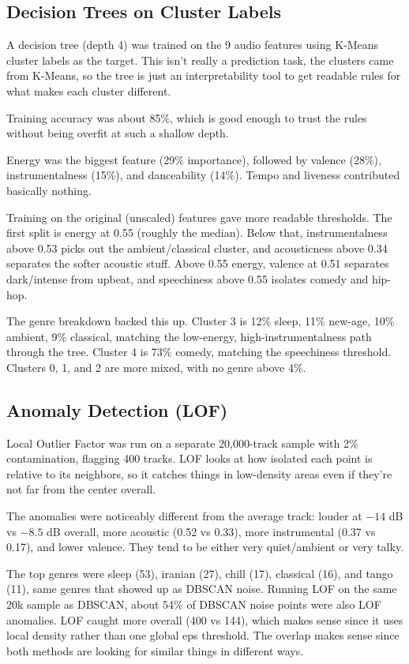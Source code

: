 \documentclass[10pt,twocolumn]{article}
\begin{document}
\subsection{Decision Trees on Cluster Labels}

A decision tree (depth 4) was trained on the 9 audio features using K-Means cluster labels as the target. This isn't really a prediction task, the clusters came from K-Means, so the tree is just an interpretability tool to get readable rules for what makes each cluster different.

Training accuracy was about 85\%, which is good enough to trust the rules without being overfit at such a shallow depth.

Energy was the biggest feature (29\% importance), followed by valence (28\%), instrumentalness (15\%), and danceability (14\%). Tempo and liveness contributed basically nothing.

Training on the original (unscaled) features gave more readable thresholds. The first split is energy at 0.55 (roughly the median). Below that, instrumentalness above 0.53 picks out the ambient/classical cluster, and acousticness above 0.34 separates the softer acoustic stuff. Above 0.55 energy, valence at 0.51 separates dark/intense from upbeat, and speechiness above 0.55 isolates comedy and hip-hop.

The genre breakdown backed this up. Cluster 3 is 12\% sleep, 11\% new-age, 10\% ambient, 9\% classical, matching the low-energy, high-instrumentalness path through the tree. Cluster 4 is 73\% comedy, matching the speechiness threshold. Clusters 0, 1, and 2 are more mixed, with no genre above 4\%.

\subsection{Anomaly Detection (LOF)}

Local Outlier Factor was run on a separate 20,000-track sample with 2\% contamination, flagging 400 tracks. LOF looks at how isolated each point is relative to its neighbors, so it catches things in low-density areas even if they're not far from the center overall.

The anomalies were noticeably different from the average track: louder at $-14$ dB vs $-8.5$ dB overall, more acoustic (0.52 vs 0.33), more instrumental (0.37 vs 0.17), and lower valence. They tend to be either very quiet/ambient or very talky.

The top genres were sleep (53), iranian (27), chill (17), classical (16), and tango (11), same genres that showed up as DBSCAN noise. Running LOF on the same 20k sample as DBSCAN, about 54\% of DBSCAN noise points were also LOF anomalies. LOF caught more overall (400 vs 144), which makes sense since it uses local density rather than one global eps threshold. The overlap makes sense since both methods are looking for similar things in different ways.
\end{document}
